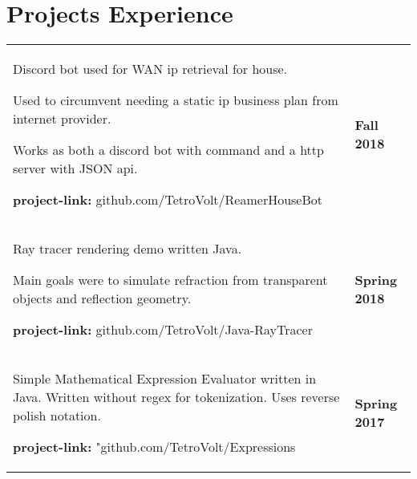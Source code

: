 \documentclass{article}
\begin{document}
\section{Projects Experience}
\begin{flushleft}
\begin{tabular}{p{13.5cm} p{2.5cm}}

\noindent{Reamer IP Bot}

\noindent{$\ \bullet$} Discord bot used for WAN ip retrieval for house.

\noindent{$\ \bullet$} Used to circumvent needing a static ip business plan from internet provider.

\noindent{$\ \bullet$} Works as both a discord bot with command and a http server with JSON api.

\noindent{$\ \bullet$} \textbf{project-link:} github.com/TetroVolt/ReamerHouseBot

    & \textbf{Fall 2018} \\

\noindent{Java Ray Tracer}

\noindent{$\ \bullet$} Ray tracer rendering demo written Java.

\noindent{$\ \bullet$} Main goals were to simulate refraction from transparent objects and reflection geometry.

\noindent{$\ \bullet$} \textbf{project-link:} github.com/TetroVolt/Java-RayTracer

    & \textbf{Spring 2018} \\

\noindent{Expressions Evaluator}

\noindent{$\ \bullet$} Simple Mathematical Expression Evaluator written in Java. Written without
regex for tokenization. Uses reverse polish notation.

\noindent{$\ \bullet$}\textbf{project-link:} "github.com/TetroVolt/Expressions

    & \textbf{Spring 2017} \\

\end{tabular}
\end{flushleft}

\clearpage
\end{document}
